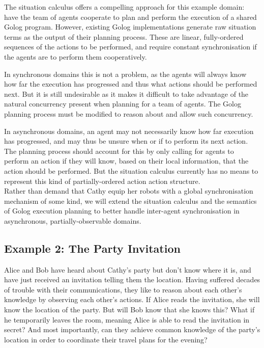 The situation calculus offers a compelling approach for this example
domain: have the team of agents cooperate to plan and perform the
execution of a shared Golog program. However, existing Golog implementations
generate raw situation terms as the output of their planning process.
These are linear, fully-ordered sequences of the actions to be performed,
and require constant synchronisation if the agents are to perform
them cooperatively.

In synchronous domains this is not a problem, as the agents will always
know how far the execution has progressed and thus what actions should
be performed next. But it is still undesirable as it makes it difficult
to take advantage of the natural concurrency present when planning
for a team of agents. The Golog planning process must be modified
to reason about and allow such concurrency.

In asynchronous domains, an agent may not necessarily know how far
execution has progressed, and may thus be unsure when or if to perform
its next action. The planning process should account for this by only
calling for agents to perform an action if they will know, based on
their local information, that the action should be performed. But
the situation calculus currently has no means to represent this kind
of partially-ordered action action structure.\\


Rather than demand that Cathy equip her robots with a global synchronisation
mechanism of some kind, we will extend the situation calculus and
the semantics of Golog execution planning to better handle inter-agent
synchronisation in asynchronous, partially-observable domains.


\subsection*{Example 2: The Party Invitation}

Alice and Bob have heard about Cathy's party but don't know where
it is, and have just received an invitation telling them the location.
Having suffered decades of trouble with their communications, they
like to reason about each other's knowledge by observing each other's
actions. If Alice reads the invitation, she will know the location
of the party. But will Bob know that she knows this? What if he temporarily
leaves the room, meaning Alice is able to read the invitation in secret?
And most importantly, can they achieve common knowledge of the party's
location in order to coordinate their travel plans for the evening?\\


